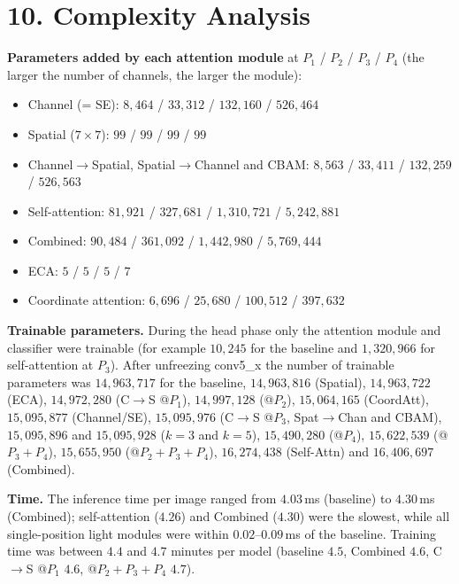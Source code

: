 \documentclass[10pt]{article}
\begin{document}
\section*{10. Complexity Analysis}

\textbf{Parameters added by each attention module} at $P_1$ / $P_2$ / $P_3$ /
$P_4$ (the larger the number of channels, the larger the module):

\begin{itemize}\small
\item Channel (= SE): $8{,}464$ / $33{,}312$ / $132{,}160$ / $526{,}464$
\item Spatial ($7\times7$): $99$ / $99$ / $99$ / $99$
\item Channel$\rightarrow$Spatial, Spatial$\rightarrow$Channel and CBAM: $8{,}563$ / $33{,}411$ / $132{,}259$ / $526{,}563$
\item Self-attention: $81{,}921$ / $327{,}681$ / $1{,}310{,}721$ / $5{,}242{,}881$
\item Combined: $90{,}484$ / $361{,}092$ / $1{,}442{,}980$ / $5{,}769{,}444$
\item ECA: $5$ / $5$ / $5$ / $7$
\item Coordinate attention: $6{,}696$ / $25{,}680$ / $100{,}512$ / $397{,}632$
\end{itemize}

\textbf{Trainable parameters.} During the head phase only the attention module
and classifier were trainable (for example $10{,}245$ for the baseline and
$1{,}320{,}966$ for self-attention at $P_3$). After unfreezing conv5\_x the
number of trainable parameters was $14{,}963{,}717$ for the baseline,
$14{,}963{,}816$ (Spatial), $14{,}963{,}722$ (ECA), $14{,}972{,}280$
(C$\rightarrow$S @$P_1$), $14{,}997{,}128$ (@$P_2$), $15{,}064{,}165$
(CoordAtt), $15{,}095{,}877$ (Channel/SE), $15{,}095{,}976$ (C$\rightarrow$S
@$P_3$, Spat$\rightarrow$Chan and CBAM), $15{,}095{,}896$ and $15{,}095{,}928$
($k=3$ and $k=5$), $15{,}490{,}280$ (@$P_4$), $15{,}622{,}539$
(@$P_3{+}P_4$), $15{,}655{,}950$ (@$P_2{+}P_3{+}P_4$), $16{,}274{,}438$
(Self-Attn) and $16{,}406{,}697$ (Combined).

\textbf{Time.} The inference time per image ranged from $4.03$\,ms (baseline)
to $4.30$\,ms (Combined); self-attention ($4.26$) and Combined ($4.30$) were
the slowest, while all single-position light modules were within
$0.02$--$0.09$\,ms of the baseline. Training time was between $4.4$ and $4.7$ minutes per model
(baseline $4.5$, Combined $4.6$, C$\rightarrow$S @$P_1$ $4.6$,
@$P_2{+}P_3{+}P_4$ $4.7$).
\end{document}
